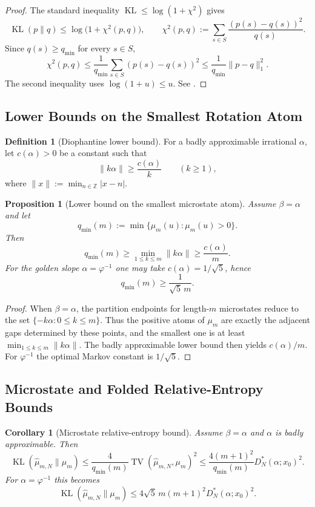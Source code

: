\documentclass[11pt,letterpaper]{article}
\numberwithin{equation}{section}
\theoremstyle{plain}
\newtheorem{proposition}[theorem]{Proposition}
\newtheorem{corollary}[theorem]{Corollary}
\theoremstyle{definition}
\newtheorem{definition}[theorem]{Definition}
\theoremstyle{remark}
\DeclareMathOperator{\TV}{TV}
\DeclareMathOperator{\KL}{KL}
\begin{document}
\begin{proof}
The standard inequality \(\KL\le \log(1+\chi^2)\) gives
\[
\KL(p\|q)\le \log\bigl(1+\chi^2(p,q)\bigr),
\qquad
\chi^2(p,q):=\sum_{s\in S}\frac{(p(s)-q(s))^2}{q(s)}.
\]
Since \(q(s)\ge q_{\min}\) for every \(s\in S\),
\[
\chi^2(p,q)
\le
\frac{1}{q_{\min}}\sum_{s\in S}(p(s)-q(s))^2
\le
\frac{1}{q_{\min}}\|p-q\|_1^2.
\]
The second inequality uses \(\log(1+u)\le u\). See
\cite{SasonVerdu2016fDivergence}.
\end{proof}

\subsection{Lower Bounds on the Smallest Rotation Atom}

\begin{definition}[Diophantine lower bound]
For a badly approximable irrational $\alpha$, let $c(\alpha)>0$ be a constant
such that
\[
\|k\alpha\|\ge \frac{c(\alpha)}{k}\qquad (k\ge 1),
\]
where $\|x\|:=\min_{n\in\mathbb{Z}}|x-n|$.
\end{definition}

\begin{proposition}[Lower bound on the smallest microstate atom]\label{prop:qmin-lowerbound-markov}
Assume $\beta=\alpha$ and let
\[
q_{\min}(m):=\min\{\mu_m(u):\mu_m(u)>0\}.
\]
Then
\[
q_{\min}(m)\ge \min_{1\le k\le m}\|k\alpha\|\ge \frac{c(\alpha)}{m}.
\]
For the golden slope $\alpha=\varphi^{-1}$ one may take
$c(\alpha)=1/\sqrt5$, hence
\[
q_{\min}(m)\ge \frac{1}{\sqrt5\,m}.
\]
\end{proposition}

\begin{proof}
When $\beta=\alpha$, the partition endpoints for length-$m$ microstates reduce
to the set $\{-k\alpha:0\le k\le m\}$.  Thus the positive atoms of $\mu_m$ are
exactly the adjacent gaps determined by these points, and the smallest one is
at least $\min_{1\le k\le m}\|k\alpha\|$.  The badly approximable lower bound
then yields $c(\alpha)/m$.  For $\varphi^{-1}$ the optimal Markov constant is
$1/\sqrt5$.
\end{proof}

\subsection{Microstate and Folded Relative-Entropy Bounds}

\begin{corollary}[Microstate relative-entropy bound]\label{cor:rotation-microstate-kl-certificate}
Assume $\beta=\alpha$ and $\alpha$ is badly approximable.  Then
\[
\KL(\hat\mu_{m,N}\|\mu_m)
\le
\frac{4}{q_{\min}(m)}\TV(\hat\mu_{m,N},\mu_m)^2
\le
\frac{4(m+1)^2}{q_{\min}(m)}D_N^*(\alpha;x_0)^2.
\]
For $\alpha=\varphi^{-1}$ this becomes
\[
\KL(\hat\mu_{m,N}\|\mu_m)
\le
4\sqrt5\,m(m+1)^2 D_N^*(\alpha;x_0)^2.
\]
\end{corollary}
\end{document}
